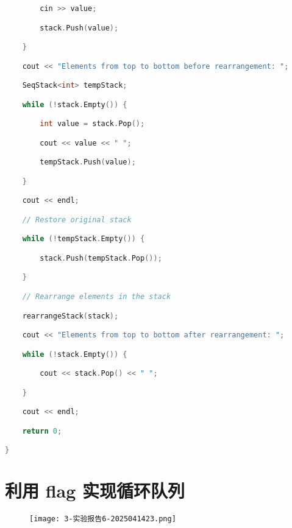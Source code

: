 \begin{lstlisting}[language=C++]
        cin >> value;

        stack.Push(value);

    }

    cout << "Elements from top to bottom before rearrangement: ";

    SeqStack<int> tempStack;

    while (!stack.Empty()) {

        int value = stack.Pop();

        cout << value << " ";

        tempStack.Push(value);

    }

    cout << endl;

    // Restore original stack

    while (!tempStack.Empty()) {

        stack.Push(tempStack.Pop());

    }

    // Rearrange elements in the stack

    rearrangeStack(stack);

    cout << "Elements from top to bottom after rearrangement: ";

    while (!stack.Empty()) {

        cout << stack.Pop() << " ";

    }

    cout << endl;

    return 0;

}
\end{lstlisting}
\section{利用 flag 实现循环队列}

\begin{figure}[H]
\centering
\texttt{[image: 3-实验报告6-2025041423.png]}
\label{}
\end{figure}

